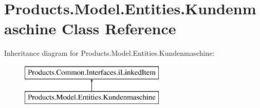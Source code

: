 \hypertarget{class_products_1_1_model_1_1_entities_1_1_kundenmaschine}{}\section{Products.\+Model.\+Entities.\+Kundenmaschine Class Reference}
\label{class_products_1_1_model_1_1_entities_1_1_kundenmaschine}
Inheritance diagram for Products.\+Model.\+Entities.\+Kundenmaschine\+:\begin{figure}[H]
\begin{center}
\leavevmode
\includegraphics[height=2.000000cm]{class_products_1_1_model_1_1_entities_1_1_kundenmaschine}
\end{center}
\end{figure}
